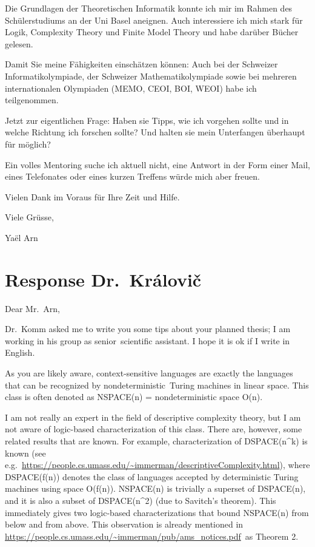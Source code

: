 Die Grundlagen der Theoretischen Informatik konnte ich mir im Rahmen des
Schülerstudiums an der Uni Basel aneignen. Auch interessiere ich mich
stark für Logik, Complexity Theory und Finite Model Theory und habe
darüber Bücher gelesen.

Damit Sie meine Fähigkeiten einschätzen können: Auch bei der Schweizer
Informatikolympiade, der Schweizer Mathematikolympiade sowie bei
mehreren internationalen Olympiaden (MEMO, CEOI, BOI, WEOI) habe ich
teilgenommen.

Jetzt zur eigentlichen Frage: Haben sie Tipps, wie ich vorgehen sollte
und in welche Richtung ich forschen sollte? Und halten sie mein
Unterfangen überhaupt für möglich?

Ein volles Mentoring suche ich aktuell nicht, eine Antwort in der Form
einer Mail, eines Telefonates oder eines kurzen Treffens würde mich aber
freuen.

Vielen Dank im Voraus für Ihre Zeit und Hilfe.

Viele Grüsse,

Yaël Arn

\section{Response
Dr.~Královi\v{c}}\label{response-dr.-kruxe1loviux10d}

Dear Mr.~Arn,

Dr.~Komm asked me to write you some tips about your planned thesis; I am
working in his group as senior~scientific assistant. I hope it is ok if
I write in English.

As you are likely aware, context-sensitive languages are exactly the
languages that can be recognized by nondeterministic~Turing machines in
linear space. This class is often denoted as NSPACE(n) =
nondeterministic space O(n).

I am not really an expert in the field of descriptive complexity theory,
but I am not aware of logic-based characterization of this class. There
are, however, some related results that are known. For example,
characterization of DSPACE(n\^{}k) is known (see
e.g.~\url{https://people.cs.umass.edu/~immerman/descriptiveComplexity.html}),
where DSPACE(f(n)) denotes the class of languages accepted by
deterministic Turing machines using space O(f(n)). NSPACE(n) is
trivially a superset of DSPACE(n), and it is also a subset of
DSPACE(n\^{}2) (due to Savitch's theorem). This immediately gives two
logic-based characterizations that bound NSPACE(n) from below and from
above. This observation is already mentioned in
\url{https://people.cs.umass.edu/~immerman/pub/ams_notices.pdf}~as
Theorem 2.

